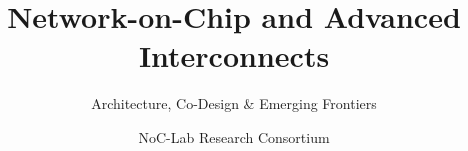 \documentclass[graybox,envcountchap]{svmono}
\begin{document}
\author{NoC-Lab Research Consortium}
\title{Network-on-Chip and Advanced Interconnects}
\subtitle{Architecture, Co-Design \& Emerging Frontiers}
\maketitle

\frontmatter%




\tableofcontents



\mainmatter%

























\backmatter%






\printindex
\end{document}
